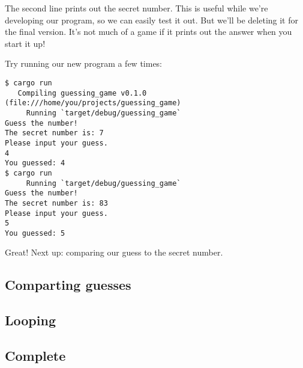 \blank

The second line prints out the secret number. This is useful while we’re developing our program, so we can easily test it out. 
But we’ll be deleting it for the final version. It’s not much of a game if it prints out the answer when you start it up!

\blank

Try running our new program a few times:

\begin{verbatim}
$ cargo run
   Compiling guessing_game v0.1.0 (file:///home/you/projects/guessing_game)
     Running `target/debug/guessing_game`
Guess the number!
The secret number is: 7
Please input your guess.
4
You guessed: 4
$ cargo run
     Running `target/debug/guessing_game`
Guess the number!
The secret number is: 83
Please input your guess.
5
You guessed: 5
\end{verbatim}

Great! Next up: comparing our guess to the secret number.

\subsection{Comparting guesses}

\subsection{Looping}

\subsection{Complete}
